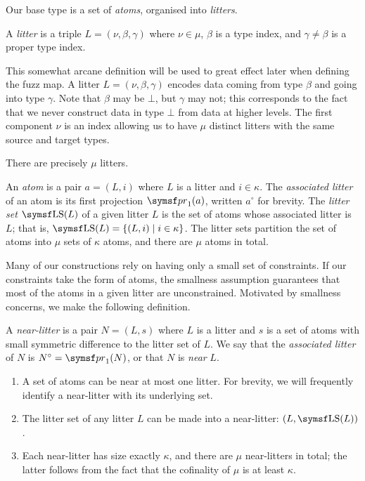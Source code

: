 Our base type is a set of \emph{atoms}, organised into \emph{litters}.
\begin{definition}
    A \emph{litter} is a triple \( L = (\nu, \beta, \gamma) \) where \( \nu \in \mu \), \( \beta \) is a type index, and \( \gamma \neq \beta \) is a proper type index.
\end{definition}
This somewhat arcane definition will be used to great effect later when defining the fuzz map.
A litter \( L = (\nu, \beta, \gamma) \) encodes data coming from type \( \beta \) and going into type \( \gamma \).
Note that \( \beta \) may be \( \bot \), but \( \gamma \) may not; this corresponds to the fact that we never construct data in type \( \bot \) from data at higher levels.
The first component \( \nu \) is an index allowing us to have \( \mu \) distinct litters with the same source and target types.
\begin{remark}
    There are precisely \( \mu \) litters.
\end{remark}
\begin{definition}
    An \emph{atom} is a pair \( a = (L, i) \) where \( L \) is a litter and \( i \in \kappa \).
    The \emph{associated litter} of an atom is its first projection \( \pr_1(a) \), written \( a^\circ \) for brevity.
    The \emph{litter set} \( \LS(L) \) of a given litter \( L \) is the set of atoms whose associated litter is \( L \); that is, \( \LS(L) = \{ (L, i) \mid i \in \kappa \} \).
    The litter sets partition the set of atoms into \( \mu \) sets of \( \kappa \) atoms, and there are \( \mu \) atoms in total.
\end{definition}
\begin{remark}
    Many of our constructions rely on having only a small set of constraints.
    If our constraints take the form of atoms, the smallness assumption guarantees that most of the atoms in a given litter are unconstrained.
    Motivated by smallness concerns, we make the following definition.
\end{remark}
\begin{definition}
    A \emph{near-litter} is a pair \( N = (L, s) \) where \( L \) is a litter and \( s \) is a set of atoms with small symmetric difference to the litter set of \( L \).
    We say that the \emph{associated litter} of \( N \) is \( N^\circ = \pr_1(N) \), or that \( N \) is \emph{near} \( L \).
\end{definition}
\begin{remarks}
    \label{rk:mk_near_litter}
    \begin{enumerate}
        \item A set of atoms can be near at most one litter.
        For brevity, we will frequently identify a near-litter with its underlying set.
        \item The litter set of any litter \( L \) can be made into a near-litter: \( (L, \LS(L)) \).
        \item Each near-litter has size exactly \( \kappa \), and there are \( \mu \) near-litters in total; the latter follows from the fact that the cofinality of \( \mu \) is at least \( \kappa \).
    \end{enumerate}
\end{remarks}
